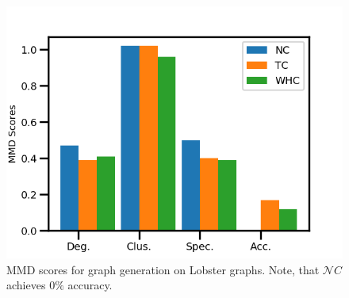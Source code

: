 \begin{figure}
    \centering
    \includegraphics[width=0.85\linewidth]{lobster_graph_gen.png}
    \vspace{-15pt}
    \caption{MMD scores for graph generation on Lobster graphs. Note, that $\mathcal{N}C$ achieves $0\%$ accuracy.}
    \label{fig:lobster_graph_gen}
    \vspace{-15pt}
\end{figure}

